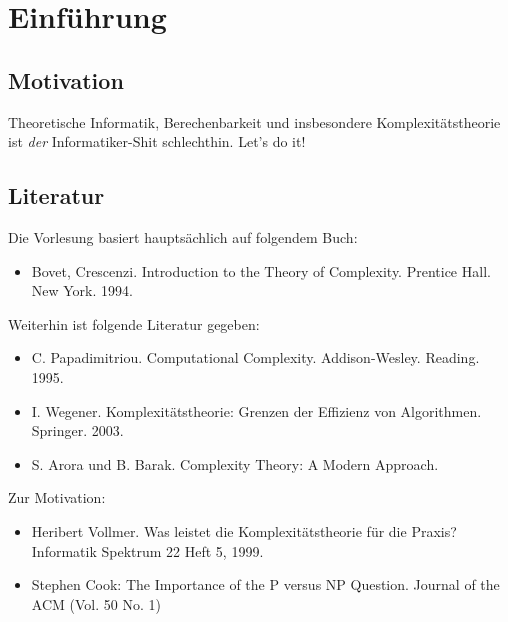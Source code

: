 



\chapter{Einführung} %
\label{cha:einfuhrung}



\section{Motivation}

Theoretische Informatik, Berechenbarkeit und insbesondere Komplexitätstheorie ist \emph{der} Informatiker-Shit schlechthin. Let's do it!



\section{Literatur}

Die Vorlesung basiert hauptsächlich auf folgendem Buch:
\begin{itemize}
    \item Bovet, Crescenzi. Introduction to the Theory of Complexity. Prentice Hall. New York. 1994.
\end{itemize}

Weiterhin ist folgende Literatur gegeben:
\begin{itemize}
    \item C. Papadimitriou. Computational Complexity. Addison-Wesley. Reading. 1995.
    \item I. Wegener. Komplexitätstheorie: Grenzen der Effizienz von Algorithmen. Springer. 2003.
    \item S. Arora und B. Barak. Complexity Theory: A Modern Approach. 
\end{itemize}

Zur Motivation:
\begin{itemize}
    \item Heribert Vollmer. Was leistet die Komplexitätstheorie für die Praxis? Informatik Spektrum 22 Heft 5, 1999.
    \item Stephen Cook: The Importance of the P versus NP Question. Journal of the ACM (Vol. 50 No. 1)
\end{itemize}








